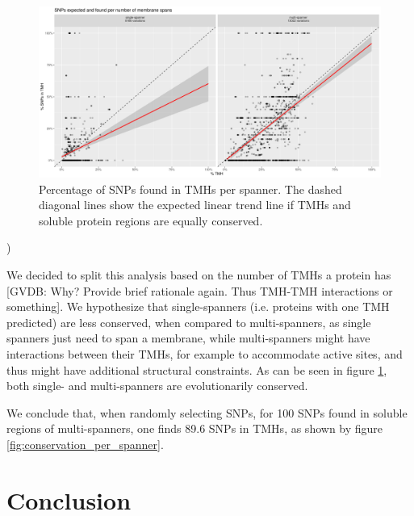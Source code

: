 \begin{figure}[!htbp]
  \includegraphics[width=\textwidth]{ncbi_peregrine_results/fig_f_snps_found_and_expected_per_spanner.png}
  \caption{
    Percentage of SNPs found in TMHs per spanner.
    The dashed diagonal lines show the expected linear trend line
    if TMHs and soluble protein regions are equally conserved.
  }
  \label{fig:f_snps_found_and_expected_per_spanner}
\end{figure}
)

We decided to split this analysis based on the number of TMHs
a protein has 
[GVDB: Why? Provide brief rationale again. 
Thus TMH-TMH interactions or something]. 
We hypothesize that single-spanners (i.e. proteins
with one TMH predicted) are less conserved, when compared to multi-spanners,
as single spanners just need to span a membrane, while multi-spanners
might have interactions between their TMHs, 
for example to accommodate active sites, and 
thus might have additional structural constraints.
As can be seen in figure \ref{fig:f_snps_found_and_expected_per_spanner}, 
both single- and multi-spanners are evolutionarily conserved.

We conclude that,
when randomly selecting SNPs, 
for 100 SNPs found in soluble regions of multi-spanners,
one finds 89.6 SNPs in TMHs, as shown by 
figure \ref{fig:conservation_per_spanner}.

\section{Conclusion}


